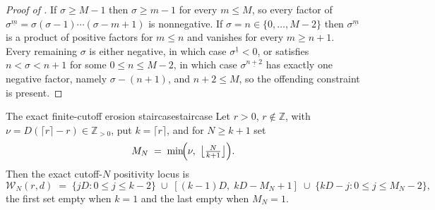 \documentclass[11pt,letterpaper]{article}
\newcommand{\Zint}{\mathbb{Z}}
\begin{document}
\begin{proof}[Proof of ]
If $\sigma\ge M-1$ then $\sigma\ge m-1$ for every $m\le M$, so every factor of
$\sigma^{\underline m}=\sigma(\sigma-1)\cdots(\sigma-m+1)$ is nonnegative. If
$\sigma=n\in\{0,\dots,M-2\}$ then $\sigma^{\underline m}$ is a product of
positive factors for $m\le n$ and vanishes for every $m\ge n+1$. Every remaining
$\sigma$ is either negative, in which case $\sigma^{\underline1}<0$, or satisfies
$n<\sigma<n+1$ for some $0\le n\le M-2$, in which case $\sigma^{\underline{n+2}}$
has exactly one negative factor, namely $\sigma-(n+1)$, and $n+2\le M$, so the
offending constraint is present.
\end{proof}

\begin{theorem}{The exact finite-cutoff erosion staircase}{staircase}
Let $r>0$, $r\notin\Zint$, with $\nu=D(\lceil r\rceil-r)\in\Zint_{>0}$, put
$k=\lceil r\rceil$, and for $N\ge k+1$ set
\begin{equation}
  M_N\;=\;\min\!\Bigl(\nu,\ \bigl\lfloor\tfrac{N}{k+1}\bigr\rfloor\Bigr).
  \label{eq:MN}
\end{equation}
Then the exact cutoff-$N$ positivity locus is
\begin{equation}
  \mathcal{W}_N(r,d)
  \;=\;\bigl\{jD:0\le j\le k-2\bigr\}
  \;\cup\;[(k-1)D,\;kD-M_N+1]
  \;\cup\;\bigl\{kD-j:0\le j\le M_N-2\bigr\},
  \label{eq:staircase}
\end{equation}
the first set empty when $k=1$ and the last empty when $M_N=1$.
\end{theorem}
\end{document}
